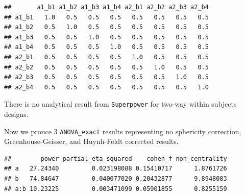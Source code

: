 \documentclass[]{book}
\newenvironment{Shaded}{\begin{snugshade}}{\end{snugshade}}
\newcommand{\CommentTok}[1]{\textcolor[rgb]{0.56,0.35,0.01}{\textit{#1}}}
\newcommand{\DataTypeTok}[1]{\textcolor[rgb]{0.13,0.29,0.53}{#1}}
\newcommand{\KeywordTok}[1]{\textcolor[rgb]{0.13,0.29,0.53}{\textbf{#1}}}
\newcommand{\NormalTok}[1]{#1}
\newcommand{\OperatorTok}[1]{\textcolor[rgb]{0.81,0.36,0.00}{\textbf{#1}}}
\newcommand{\OtherTok}[1]{\textcolor[rgb]{0.56,0.35,0.01}{#1}}
\newcommand{\StringTok}[1]{\textcolor[rgb]{0.31,0.60,0.02}{#1}}
\begin{document}
\begin{verbatim}
##       a1_b1 a1_b2 a1_b3 a1_b4 a2_b1 a2_b2 a2_b3 a2_b4
## a1_b1   1.0   0.5   0.5   0.5   0.5   0.5   0.5   0.5
## a1_b2   0.5   1.0   0.5   0.5   0.5   0.5   0.5   0.5
## a1_b3   0.5   0.5   1.0   0.5   0.5   0.5   0.5   0.5
## a1_b4   0.5   0.5   0.5   1.0   0.5   0.5   0.5   0.5
## a2_b1   0.5   0.5   0.5   0.5   1.0   0.5   0.5   0.5
## a2_b2   0.5   0.5   0.5   0.5   0.5   1.0   0.5   0.5
## a2_b3   0.5   0.5   0.5   0.5   0.5   0.5   1.0   0.5
## a2_b4   0.5   0.5   0.5   0.5   0.5   0.5   0.5   1.0
\end{verbatim}

There is no analytical result from \texttt{Superpower} for two-way within subjects designs.

Now we prouce 3 \texttt{ANOVA\_exact} results representing no sphericity correction, Greenhouse-Geisser, and Huynh-Feldt corrected results.

\begin{Shaded}
\end{Shaded}

\begin{verbatim}
##        power partial_eta_squared    cohen_f non_centrality
## a   27.24340         0.023198088 0.15410717      1.8761726
## b   74.84647         0.040077020 0.20432877      9.8948083
## a:b 10.23225         0.003471099 0.05901855      0.8255159
\end{verbatim}

\begin{Shaded}
\end{Shaded}
\end{document}
